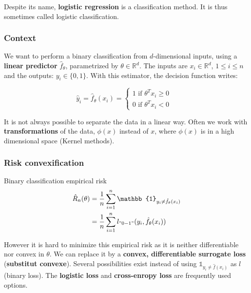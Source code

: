 \documentclass[
10pt, %
a4paper, %
oneside, %
headinclude,footinclude, %
BCOR5mm, %
]{scrartcl}
\begin{document}
Despite its name, \textbf{{logistic regression}} is a classification method. It
is thus sometimes called logistic classification.

\subsubsection{\large\color{Periwinkle}Context}

We want to perform a binary classification from $d$-dimensional inputs, using a
\textbf{{linear predictor}} $\hat{f}_{\theta}$, parametrized by $\theta\in \mathbb{R}^d$. The inputs are $x_i \in \mathbb{R}^d$, $1\leq i \leq n$ and the outputs: $y_i\in \{0, 1\}$. With this estimator, the decision function writes:

$$
\hat{y}_i = \hat{f}_{\theta}(x_i)=\left\{
    \begin{array}{ll}
	1 \text{ if } \theta^Tx_i \geq 0 & \\
        0 \text{ if } \theta^Tx_i < 0& 
    \end{array}
\right.
$$

\begin{remark}
    It is not always possible to separate the data in a linear way. Often we work with \textbf{{transformations}} of the data, $\phi(x)$ instead of $x$, where $\phi(x)$ is in a high dimensional space (Kernel methods).
\end{remark}


\subsubsection{\large\color{Periwinkle}Risk convexification}

\begin{definition}{Binary classification empirical risk}
    \begin{equation}
	\begin{aligned}
	    \label{eq:}
	    \hat{R}_n(\theta) &= \frac{1}{n} \sum^{n}_{i=1} \mathbb{1}_{y_i\neq \hat{f}_{\theta}(x_i)}    \\
	    &=\frac{1}{n} \sum^{n}_{i=1} l_{"0-1"}(y_i,\hat{f}_{\theta}(x_i))  
	\end{aligned}
    \end{equation}
\end{definition}

However it is hard to minimize this empirical risk as it is neither differentiable nor convex in $\theta$. We can replace it by a \textbf{{convex, differentiable surrogate loss}} (\textbf{{substitut convexe}}). Several possibilities exist instead of using $ \mathbb{1}_{y_i\neq \hat{f}(x_i)}    $ as $l$ (binary loss). The \textbf{{logistic loss}} and \textbf{{cross-enropy loss}} are frequently used options.
\end{document}
